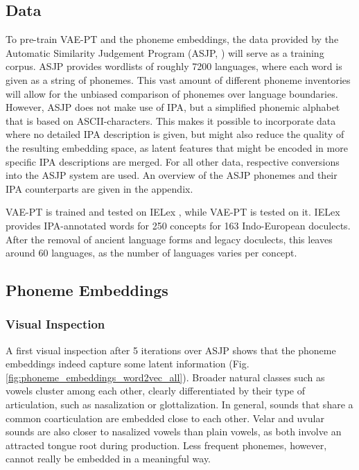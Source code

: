 \documentclass[6pt]{article}
\begin{document}
\subsection{Data}
To pre-train VAE-PT and the phoneme embeddings,  the data provided by the Automatic Similarity Judgement Program (ASJP, \cite{wichmann2010asjp}) will serve as a training corpus. ASJP provides wordlists of roughly 7200 languages, where each word is given as a string of phonemes. This vast amount of different phoneme inventories will allow for the unbiased comparison of phonemes over language boundaries. However, ASJP does not make use of IPA, but a simplified phonemic alphabet that is based on ASCII-characters. This makes it possible to incorporate data where no detailed IPA description is given, but might also reduce the quality of the resulting embedding space, as latent features that might be encoded in more specific IPA descriptions are merged. For all other data, respective conversions into the ASJP system are used.  An overview of the ASJP phonemes and their IPA counterparts are given in the appendix.

VAE-PT is trained and tested on IELex \citep{dunn2012indo}, while VAE-PT is tested on it. IELex provides IPA-annotated words for 250 concepts for 163 Indo-European doculects. After the removal of ancient language forms and legacy doculects, this leaves around 60 languages, as the number of languages varies per concept.
\subsection{Phoneme Embeddings}
\subsubsection{Visual Inspection}
A first visual inspection after 5 iterations over ASJP shows that the phoneme embeddings indeed capture some latent information (Fig.  \ref{fig:phoneme_embeddings_word2vec_all}). Broader natural classes such as vowels cluster among each other,  clearly differentiated by their type of articulation, such as nasalization or glottalization. In general, sounds that share a common coarticulation are embedded close to each other. Velar and uvular sounds are also closer to nasalized vowels than plain vowels, as both involve an attracted tongue root during production. Less frequent phonemes, however, cannot really be embedded in a meaningful way.
\end{document}

